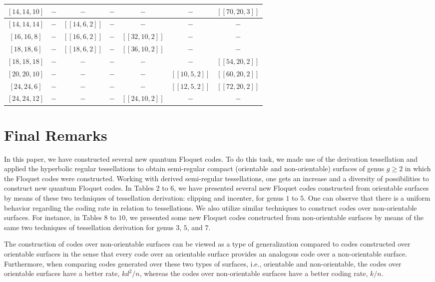 \documentclass[%
reprint,
amsmath,amssymb,
aps,
]{revtex4-2}
\begin{document}
\begin{table}
\begin{ruledtabular}
\begin{tabular}{|c|c|c|c|c|c|c|}
			$[14,14,10]$ & $-$ & $-$ & $-$ & $-$ & $-$ & $[[70, 20, 3]]$ \\ \hline
			$[14,14,14]$ & $-$ & $[[14, 6, 2]]$ & $-$ & $-$ & $-$ & $-$ \\ \hline
			$[16,16,8]$ & $-$& $[[16, 6, 2]]$ & $-$ & $[[32, 10, 2]]$ & $-$ & $-$  \\ \hline
			$[18,18,6]$ & $-$ & $[[18, 6, 2]]$ & $-$ & $[[36, 10, 2]]$ & $-$ & $-$ \\ \hline
			$[18,18,18]$ & $-$ & $-$ & $-$ & $-$& $-$& $[[54,20,2]]$ \\ \hline
			$[20,20,10]$ & $-$& $-$ & $-$ & $-$ & $[[10, 5, 2]]$ & $[[60, 20, 2]]$ \\ \hline
			$[24,24,6]$ & $-$ & $-$ & $-$ & $-$ & $[[12, 5, 2]]$ & $[[72, 20, 2]]$ \\ \hline
			$[24,24,12]$ & $-$ & $-$ & $-$ & $[[24, 10, 2]]$ & $-$ & $-$ \\
				\end{tabular}
		\end{ruledtabular}
	\end{table}
			
	
	\section{Final Remarks}\label{FR}
	
In this paper, we have constructed several new quantum Floquet codes. To do this task, we made use of the derivation tessellation and applied the hyperbolic regular tessellations to obtain semi-regular compact (orientable and non-orientable) surfaces of genus $g\geq 2$ in which the Floquet codes were constructed. Working with derived semi-regular tessellations, one gets an increase and a diversity of possibilities to construct new quantum Floquet codes. In Tables $2$ to $6$, we have presented several new Floquet codes constructed from orientable surfaces by means of these two techniques of tessellation derivation: clipping and incenter, for genus $1$ to $5$. One can observe that there is a uniform behavior regarding the coding rate in relation to tessellations. We also utilize similar techniques to construct codes over non-orientable surfaces. For instance, in Tables $8$ to $10$, we presented some new Floquet codes constructed from non-orientable surfaces by means of the same two techniques of tessellation derivation for genus $3$, $5$, and $7$.
	
The construction of codes over non-orientable surfaces can be viewed as a type of generalization compared to codes constructed over orientable surfaces in the sense that every code over an orientable surface provides an analogous code over a non-orientable surface. Furthermore, when comparing codes generated over these two types of surfaces, i.e., orientable and non-orientable, the codes over orientable surfaces have a better rate, $kd^2/n$, whereas the codes over non-orientable surfaces have a better coding rate, $k/n$.
	
\end{document}
